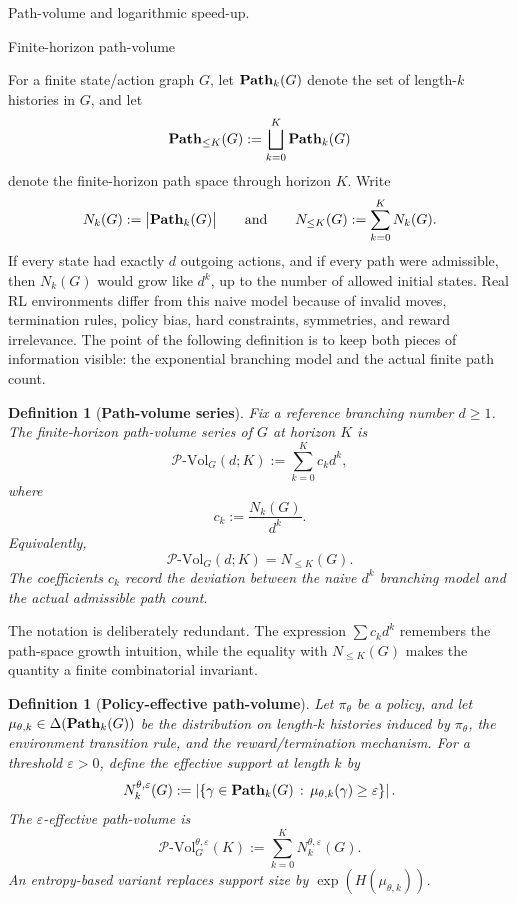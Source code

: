 \documentclass[11pt]{article}
\newtheorem{definition}[subsubsection]{Definition}
\newcommand{\PVol}{\mathcal{P}\text{-}\mathrm{Vol}}
\begin{document}

\begin{section}{Path-volume and logarithmic speed-up.}

\begin{subsection}{Finite-horizon path-volume}

For a finite state/action graph $G$, let
$
\bold{Path}_{k}(G)
$
denote the set of length-$k$ histories in $G$, and let
$$
\bold{Path}_{\le K}(G)
:=
\bigsqcup_{k=0}^{K}\bold{Path}_{k}(G)
$$
denote the finite-horizon path space through horizon $K$.
Write
$$
N_k(G):=\bigl|\bold{Path}_{k}(G)\bigr|
\qquad\text{and}\qquad
N_{\le K}(G):=\sum_{k=0}^{K}N_k(G).
$$
If every state had exactly $d$ outgoing actions, and if every path were admissible, then $N_k(G)$ would grow like $d^k$, up to the number of allowed initial states. Real RL environments differ from this naive model because of invalid moves, termination rules, policy bias, hard constraints, symmetries, and reward irrelevance. The point of the following definition is to keep both pieces of information visible: the exponential branching model and the actual finite path count.

\begin{definition}[{\bf Path-volume series}]\label{def:path-volume-series}
\normalfont
Fix a reference branching number $d\ge 1$. The finite-horizon path-volume series of $G$ at horizon $K$ is
$$
\PVol_G(d;K)
:=
\sum_{k=0}^{K}c_kd^k,
$$
where
$$
c_k:=\frac{N_k(G)}{d^k}.
$$
Equivalently,
$$
\PVol_G(d;K)=N_{\le K}(G).
$$
The coefficients $c_k$ record the deviation between the naive $d^k$ branching model and the actual admissible path count.
\end{definition}

The notation is deliberately redundant. The expression $\sum c_kd^k$ remembers the path-space growth intuition, while the equality with $N_{\le K}(G)$ makes the quantity a finite combinatorial invariant.

\begin{definition}[{\bf Policy-effective path-volume}]\label{def:policy-effective-path-volume}
\normalfont
Let $\pi_\theta$ be a policy, and let
$
\mu_{\theta,k}\in \Delta(\bold{Path}_k(G))
$
be the distribution on length-$k$ histories induced by $\pi_\theta$, the environment transition rule, and the reward/termination mechanism. For a threshold $\varepsilon>0$, define the effective support at length $k$ by
$$
N_k^{\theta,\varepsilon}(G)
:=
\left|
\left\{
\gamma\in\bold{Path}_k(G)
\,:\,
\mu_{\theta,k}(\gamma)\ge\varepsilon
\right\}
\right|.
$$
The $\varepsilon$-effective path-volume is
$$
\PVol_G^{\theta,\varepsilon}(K)
:=
\sum_{k=0}^{K}N_k^{\theta,\varepsilon}(G).
$$
An entropy-based variant replaces support size by $\exp(H(\mu_{\theta,k}))$.
\end{definition}


\end{subsection}
\end{section}
\end{document}

